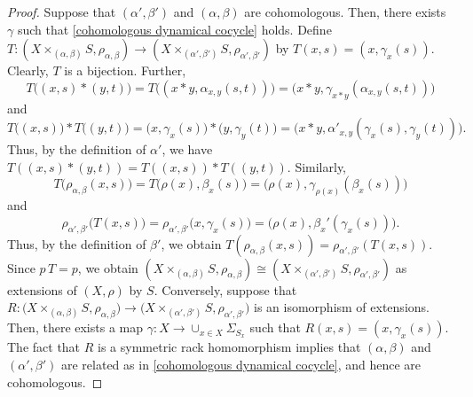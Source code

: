 \documentclass[10pt,a4paper]{amsart}
\begin{document}
\begin{proof}
Suppose that $(\alpha',\beta')$ and $(\alpha, \beta)$ are cohomologous. Then, there exists $\gamma$ such that  \eqref{cohomologous dynamical cocycle} holds. Define
$T:(X \times_{(\alpha,\beta)}S,\rho_{\alpha,\beta}) \rightarrow (X \times_{(\alpha',\beta')}S,\rho_{\alpha',\beta'})$ by $T(x,s) = (x, \gamma_x(s)).$ Clearly, $T$ is a bijection. Further,
$$T\big((x,s)*(y,t)\big)=T\big((x*y,\alpha_{x,y}(s,t))\big)=\big(x*y,\gamma_{x*y}(\alpha_{x,y}(s,t))\big)$$ and 
$$T\big((x,s)\big)*T \big((y,t) \big)=\big(x,\gamma_x(s)\big)*\big(y,\gamma_y(t)\big)=\big(x*y,\alpha'_{x, y}(\gamma_x(s),\gamma_{y}(t))\big).$$
Thus, by the definition of $\alpha'$, we have $T((x,s)*(y,t))=T((x,s))*T((y,t)).$  Similarly, 
$$T\big(\rho_{\alpha,\beta}(x,s) \big)=T \big(\rho(x),\beta_x(s) \big)=\big(\rho(x),\gamma_{\rho(x)}(\beta_x(s))\big)$$ and
$$\rho_{\alpha',\beta'}\big(T(x,s)\big)=\rho_{\alpha',\beta'} \big(x,\gamma_{x}(s)\big)=\big(\rho(x),\beta_x'(\gamma_{x}(s))\big).$$
Thus, by the definition of $\beta'$, we obtain $T(\rho_{\alpha,\beta}(x,s))=\rho_{\alpha',\beta'}(T(x,s)).$ Since $p \, T=p$,  we obtain $(X \times_{(\alpha,\beta)}S,\rho_{\alpha,\beta})\cong (X \times_{(\alpha',\beta')}S,\rho_{\alpha',\beta'})$ as extensions of $(X,\rho)$ by $S$. Conversely, suppose that $R: \big(X \times_{(\alpha,\beta)}S,\rho_{\alpha,\beta}\big) \to \big(X \times_{(\alpha',\beta')}S,\rho_{\alpha',\beta'}\big)$ is an isomorphism of extensions. Then, there exists a map $\gamma:X \rightarrow \cup_{x \in X} \Sigma_{S_{x}}$ such that $R(x,s) = (x,\gamma_x(s))$.  The fact that $R$ is a symmetric rack homomorphism implies that  $(\alpha,\beta)$ and $(\alpha',\beta')$ are related as in \eqref{cohomologous dynamical cocycle}, and hence are cohomologous. 
\end{proof}
\end{document}
